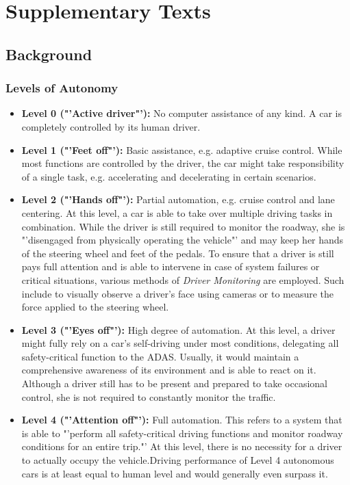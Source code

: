 \chapter{Supplementary Texts}
\label{appendix:background:supplementary_texts}

\section{Background}
\label{sec:appendix:texts:background}

\subsection{Levels of Autonomy}
\label{subsec:appendix:texts:background:levels_of_autonomy}
\begin{itemize}
	\item \textbf{Level 0 ("'Active driver"'):} No computer assistance of any kind. A car is completely controlled by its human driver.
	\item \textbf{Level 1 ("'Feet off"'):} Basic assistance, e.g. adaptive cruise control. While most functions are controlled by the driver, the car might take responsibility of a single task, e.g. accelerating and decelerating in certain scenarios.
	\item \textbf{Level 2 ("'Hands off"'):} Partial automation, e.g. cruise control and lane centering. At this level, a car is able to take over multiple driving tasks in combination. While the driver is still required to monitor the roadway, she is "'disengaged from physically operating the vehicle"' \cite{Klein} and may keep her hands of the steering wheel and feet of the pedals. To ensure that a driver is still pays full attention and is able to intervene in case of system failures or critical situations, various methods of \textit{Driver Monitoring} are employed. Such include to visually observe a driver's face using cameras or to measure the force applied to the steering wheel.
	\item \textbf{Level 3 ("'Eyes off"'):} High degree of automation. At this level, a driver might fully rely on a car's self-driving under most conditions, delegating all safety-critical function to the ADAS. Usually, it would maintain a comprehensive awareness of its environment and is able to react on it. Although a driver still has to be present and prepared to take occasional control, she is not required to constantly monitor the traffic. 
	\item \textbf{Level 4 ("'Attention off"'):} Full automation. This refers to a system that is able to "'perform all safety-critical driving functions and monitor roadway conditions for an entire trip."' \cite{2016transportation} At this level, there is no necessity for a driver to actually occupy the vehicle.Driving performance of Level 4 autonomous cars is at least equal to human level and would generally even surpass it. 

\end{itemize}
